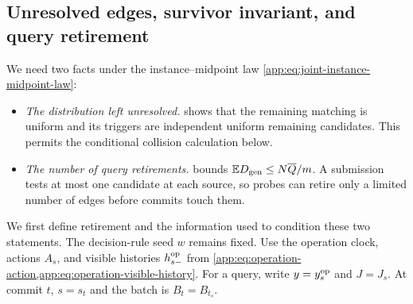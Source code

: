 \subsection{Unresolved edges, survivor invariant, and query retirement}
\label{app:lower-proof-invariant}

We need two facts under the instance--midpoint law
\eqref{app:eq:joint-instance-midpoint-law}:
\begin{itemize}
\item \emph{The distribution left unresolved.}
 shows that the remaining matching is
uniform and its triggers are independent uniform remaining candidates.
This permits the conditional collision calculation below.
\item \emph{The number of query retirements.}
 bounds
\(\mathbb ED_{\mathrm{gen}}\le N\overline Q{}/m\).
A submission tests at most one candidate at each source, so probes can
retire only a limited number of edges before commits touch them.
\end{itemize}
We first define retirement and the information used to condition these
two statements. The decision-rule seed \(w\) remains fixed.
Use the operation clock, actions \(A_s\), and visible histories
\(h^{\mathrm{op}}_{s-}\) from
\cref{app:eq:operation-action,app:eq:operation-visible-history}.
For a query, write \(y=y^{\mathrm{op}}_{s}\) and \(J=J_s\).
At commit \(t\), \(s=s_t\) and the batch is \(B_t=B_{t_s}\).

